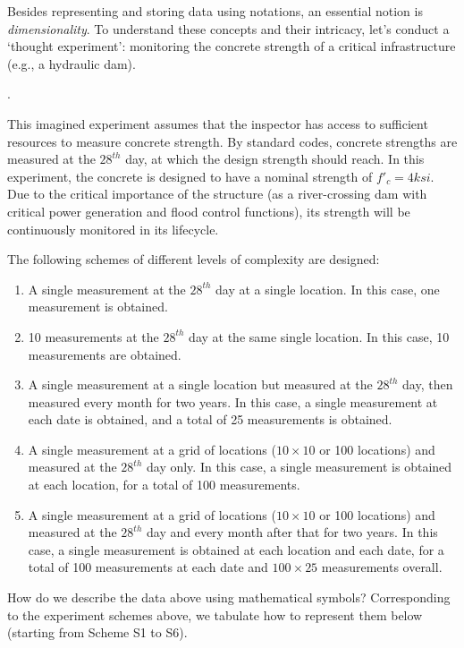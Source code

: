 \documentclass[12pt]{article}
\begin{document}
Besides representing and storing data using notations, an essential notion is \textit{dimensionality}. To understand these concepts and their intricacy, let's conduct a `thought experiment': monitoring the concrete strength of a critical infrastructure (e.g., a hydraulic dam).

\begin{ex-box}
    \noindent {}. 
    
    This imagined experiment assumes that the inspector has access to sufficient resources to measure concrete strength. By standard codes, concrete strengths are measured at the $28^{th}$ day, at which the design strength should reach. In this experiment, the concrete is designed to have a nominal strength of $f'_c = 4 ksi$. Due to the critical importance of the structure (as a river-crossing dam with critical power generation and flood control functions), its strength will be continuously monitored in its lifecycle.
    
    The following schemes of different levels of complexity are designed:
\begin{enumerate}
\item [1)] A single measurement at the $28^{th}$ day at a single location. In this case, one measurement is obtained. 

\item [2)] 10 measurements at the $28^{th}$ day at the same single location. In this case, 10 measurements are obtained. 

\item [3)] A single measurement at a single location but measured at the $28^{th}$ day, then measured every month for two years. In this case, a single measurement at each date is obtained, and a total of 25 measurements is obtained.

\item [4)] A single measurement at a grid of locations ($10 \times 10$ or 100 locations) and measured at the $28^{th}$ day only. In this case, a single measurement is obtained at each location, for a total of 100 measurements.

\item [5)] A single measurement at a grid of locations ($10 \times 10$ or 100 locations) and measured at the $28^{th}$ day and every month after that for two years. In this case, a single measurement is obtained at each location and each date, for a total of 100 measurements at each date and $100 \times 25$ measurements overall.
\end{enumerate}

How do we describe the data above using mathematical symbols? Corresponding to the experiment schemes above, we tabulate how to represent them below (starting from Scheme S1 to S6).
\end{ex-box}
\end{document}
